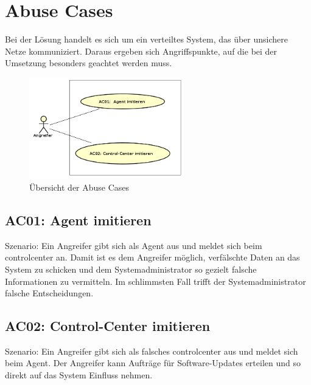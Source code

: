 \section{Abuse Cases}
\label{sec:abuse_cases}

Bei der Lösung handelt es sich um ein verteiltes System, das über unsichere Netze kommuniziert. Daraus ergeben sich Angriffspunkte, auf die bei der Umsetzung besonders geachtet werden muss.

\begin{figure}
  \centering
    \includegraphics[width=0.6\textwidth]{files/AbuseCases_small}
  \caption{Übersicht der Abuse Cases}
  \label{fig:abusecases}
\end{figure}

\subsection*{AC01: Agent imitieren}
\label{auc:01}

Szenario: Ein Angreifer gibt sich als Agent aus und meldet sich beim \gls{controlcenter} an. Damit ist es dem Angreifer möglich, verfälschte Daten an das System zu schicken und dem Systemadministrator so gezielt falsche Informationen zu vermitteln. Im schlimmsten Fall trifft der Systemadministrator falsche Entscheidungen.

\subsection*{AC02: Control-Center imitieren}
\label{auc:02}

Szenario: Ein Angreifer gibt sich als falsches \gls{controlcenter} aus und meldet sich beim Agent. Der Angreifer kann Aufträge für Software-Updates erteilen und so direkt auf das System Einfluss nehmen.